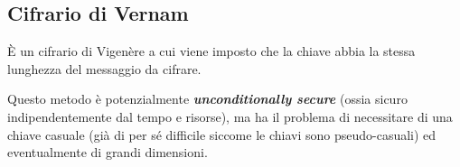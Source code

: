 \subsection{Cifrario di Vernam}
È un cifrario di Vigenère a cui viene imposto che la chiave abbia la stessa lunghezza del messaggio da cifrare.

\noindent Questo metodo è potenzialmente \textbf{\textit{unconditionally secure}} (ossia sicuro indipendentemente dal tempo e risorse), ma 
ha il problema di necessitare di una chiave casuale (già di per sé difficile siccome le chiavi sono pseudo-casuali) ed eventualmente di grandi 
dimensioni.


